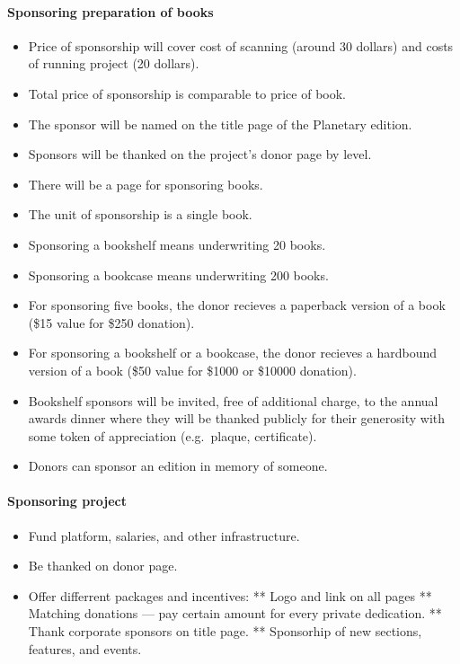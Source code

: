 \begin{itemize}
\begin{itemize}
\paragraph{Sponsoring preparation of books}

\begin{itemize}
\item
  Price of sponsorship will cover cost of scanning (around 30 dollars)
  and costs of running project (20 dollars).
\item
  Total price of sponsorship is comparable to price of book.
\item
  The sponsor will be named on the title page of the Planetary edition.
\item
  Sponsors will be thanked on the project's donor page by level.
\item
  There will be a page for sponsoring books.
\item
  The unit of sponsorship is a single book.
\item
  Sponsoring a bookshelf means underwriting 20 books.
\item
  Sponsoring a bookcase means underwriting 200 books.
\item
  For sponsoring five books, the donor recieves a paperback version of a
  book (\$15 value for \$250 donation).
\item
  For sponsoring a bookshelf or a bookcase, the donor recieves a
  hardbound version of a book (\$50 value for \$1000 or \$10000
  donation).
\item
  Bookshelf sponsors will be invited, free of additional charge, to the
  annual awards dinner where they will be thanked publicly for their
  generosity with some token of appreciation (e.g.~plaque, certificate).
\item
  Donors can sponsor an edition in memory of someone.
\end{itemize}

\paragraph{Sponsoring project}

\begin{itemize}
\item
  Fund platform, salaries, and other infrastructure.
\item
  Be thanked on donor page.
\item
  Offer differrent packages and incentives: ** Logo and link on all
  pages ** Matching donations --- pay certain amount for every private
  dedication. ** Thank corporate sponsors on title page. ** Sponsorhip
  of new sections, features, and events.
\end{itemize}


\end{itemize}
\end{itemize}
